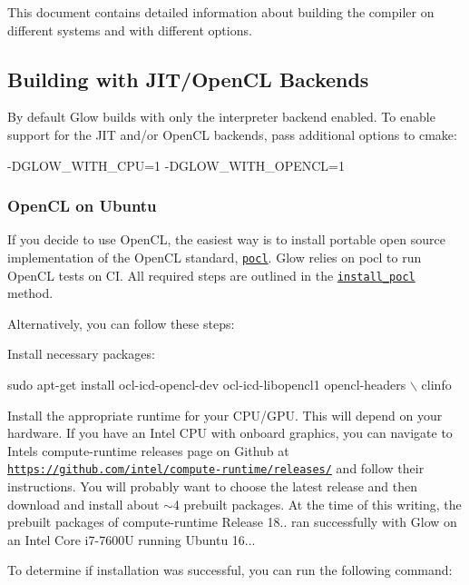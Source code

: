 This document contains detailed information about building the compiler on different systems and with different options.

\subsection*{Building with J\+I\+T/\+Open\+CL Backends}

By default Glow builds with only the interpreter backend enabled. To enable support for the J\+IT and/or Open\+CL backends, pass additional options to cmake\+:


\begin{DoxyCode}
-DGLOW\_WITH\_CPU=1 -DGLOW\_WITH\_OPENCL=1
\end{DoxyCode}


\subsubsection*{Open\+CL on Ubuntu}

If you decide to use Open\+CL, the easiest way is to install portable open source implementation of the Open\+CL standard, \href{https://github.com/pocl/pocl}{\tt pocl}. Glow relies on pocl to run Open\+CL tests on CI. All required steps are outlined in the \href{https://github.com/pytorch/glow/blob/master/.circleci/build.sh#L9}{\tt install\+\_\+pocl} method.

Alternatively, you can follow these steps\+:


\begin{DoxyEnumerate}
\item Install necessary packages\+:
\end{DoxyEnumerate}


\begin{DoxyCode}
sudo apt-get install ocl-icd-opencl-dev ocl-icd-libopencl1 opencl-headers \(\backslash\)
    clinfo
\end{DoxyCode}



\begin{DoxyEnumerate}
\item Install the appropriate runtime for your C\+P\+U/\+G\+PU. This will depend on your hardware. If you have an Intel C\+PU with onboard graphics, you can navigate to Intel\textquotesingle{}s compute-\/runtime releases page on Github at \href{https://github.com/intel/compute-runtime/releases/}{\tt https\+://github.\+com/intel/compute-\/runtime/releases/} and follow their instructions. You will probably want to choose the latest release and then download and install about $\sim$4 prebuilt packages. At the time of this writing, the prebuilt packages of compute-\/runtime Release 18.. ran successfully with Glow on an Intel Core i7-\/7600U running Ubuntu 16...
\item To determine if installation was successful, you can run the following command\+:
\end{DoxyEnumerate}



